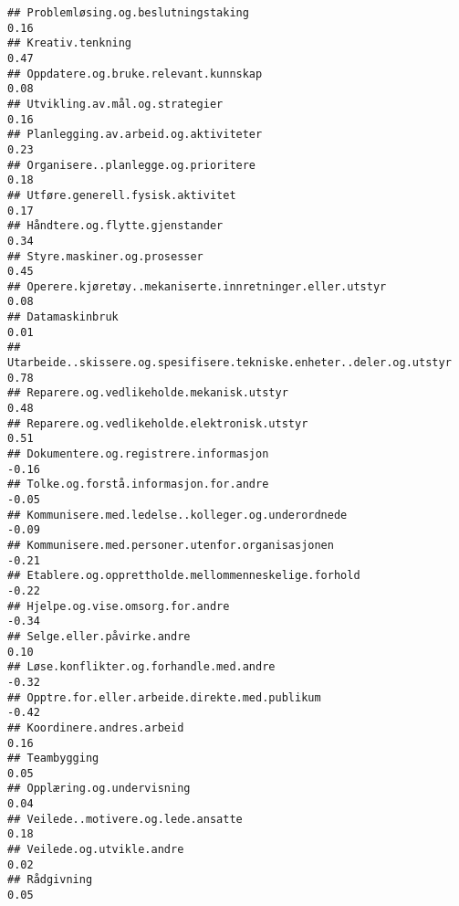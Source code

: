 \documentclass[
]{article}
\begin{document}
\begin{verbatim}
## Problemløsing.og.beslutningstaking                                                0.16
## Kreativ.tenkning                                                                  0.47
## Oppdatere.og.bruke.relevant.kunnskap                                              0.08
## Utvikling.av.mål.og.strategier                                                    0.16
## Planlegging.av.arbeid.og.aktiviteter                                              0.23
## Organisere..planlegge.og.prioritere                                               0.18
## Utføre.generell.fysisk.aktivitet                                                  0.17
## Håndtere.og.flytte.gjenstander                                                    0.34
## Styre.maskiner.og.prosesser                                                       0.45
## Operere.kjøretøy..mekaniserte.innretninger.eller.utstyr                           0.08
## Datamaskinbruk                                                                    0.01
## Utarbeide..skissere.og.spesifisere.tekniske.enheter..deler.og.utstyr              0.78
## Reparere.og.vedlikeholde.mekanisk.utstyr                                          0.48
## Reparere.og.vedlikeholde.elektronisk.utstyr                                       0.51
## Dokumentere.og.registrere.informasjon                                            -0.16
## Tolke.og.forstå.informasjon.for.andre                                            -0.05
## Kommunisere.med.ledelse..kolleger.og.underordnede                                -0.09
## Kommunisere.med.personer.utenfor.organisasjonen                                  -0.21
## Etablere.og.opprettholde.mellommenneskelige.forhold                              -0.22
## Hjelpe.og.vise.omsorg.for.andre                                                  -0.34
## Selge.eller.påvirke.andre                                                         0.10
## Løse.konflikter.og.forhandle.med.andre                                           -0.32
## Opptre.for.eller.arbeide.direkte.med.publikum                                    -0.42
## Koordinere.andres.arbeid                                                          0.16
## Teambygging                                                                       0.05
## Opplæring.og.undervisning                                                         0.04
## Veilede..motivere.og.lede.ansatte                                                 0.18
## Veilede.og.utvikle.andre                                                          0.02
## Rådgivning                                                                        0.05

\end{verbatim}
\end{document}
